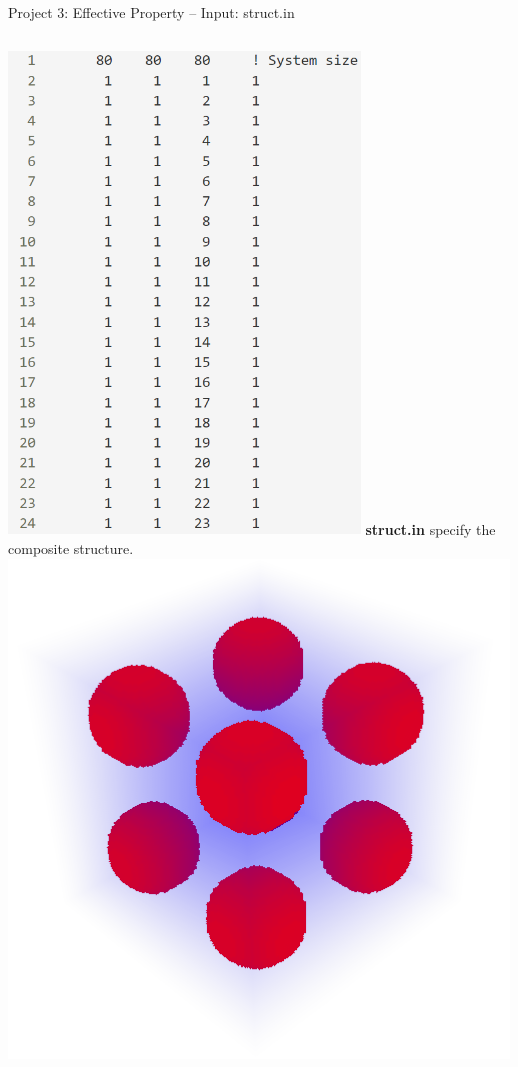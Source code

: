 \documentclass[11pt,aspectratio=169]{beamer}
\begin{document}
\begin{frame}[fragile]{Project 3: Effective Property -- Input: struct.in}
\begin{columns}
\centering
\includegraphics[width=0.7\textwidth]{img/eff_struct.png}
\justify
{\bf struct.in} specify the composite structure.
\includegraphics[width=\textwidth]{img/eff_struct_3D.png}
\end{columns}
\end{frame}
\end{document}
